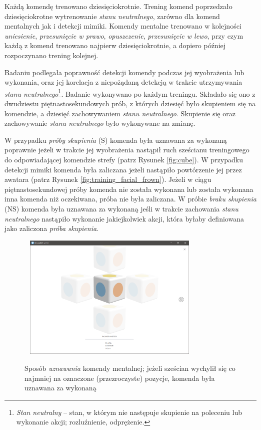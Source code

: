 \documentclass[skorowidz,skroty]{dyplomWEZUT}
\begin{document}
Każdą komendę trenowano dziesięciokrotnie. Trening komend poprzedzało dziesięciokrotne wytrenowanie \textit{stanu neutralnego}, zarówno dla komend mentalnych jak i detekcji mimiki. Komendy mentalne trenowano w kolejności \textit{uniesienie}, \textit{przesunięcie w prawo}, \textit{opuszczenie}, \textit{przesunięcie w lewo}, przy czym każdą z komend trenowano najpierw dziesięciokrotnie, a dopiero później rozpoczynano trening kolejnej.

Badaniu podlegała poprawność detekcji komendy podczas jej wyobrażenia lub wykonania, oraz jej korelacja z niepożądaną detekcją w trakcie utrzymywania \textit{stanu neutralnego}\footnote{\textit{Stan neutralny} -- stan, w którym nie następuje skupienie na poleceniu lub wykonanie akcji; rozluźnienie, odprężenie.}. Badanie wykonywano po każdym treningu. Składało się ono z dwudziestu piętnastosekundowych prób, z których dziesięć było skupieniem się na komendzie, a dziesięć zachowywaniem \textit{stanu neutralnego}. Skupienie się oraz zachowywanie \textit{stanu neutralnego} było wykonywane na zmianę.

W przypadku \textit{próby skupienia} (S) komenda była uznawana za wykonaną poprawnie jeżeli w trakcie jej wyobrażenia nastąpił ruch sześcianu treningowego do odpowiadającej komendzie strefy (patrz Rysunek \vref{fig:cube}). W przypadku detekcji mimiki komenda była zaliczana jeżeli nastąpiło powtórzenie jej przez awatara (patrz Rysunek \vref{fig:training_facial_frown}). Jeżeli w ciągu piętnastosekundowej próby komenda nie została wykonana lub została wykonana inna komenda niż oczekiwana, próba nie była zaliczana. W próbie \textit{braku skupienia} (NS) komenda była uznawana za wykonaną jeśli w trakcie zachowania \textit{stanu neutralnego} nastąpiło wykonanie jakiejkolwiek akcji, która byłaby definiowana jako zaliczona \textit{próba skupienia}.

\begin{figure}[htbp]
	\centering\includegraphics[height=6cm,width=0.8\textwidth,keepaspectratio]{graphic/emotivbci}\\
	\caption[Sposób \textit{uznawania} komendy mentalnej]{Sposób \textit{uznawania} komendy mentalnej; jeżeli sześcian wychylił się co najmniej na oznaczone (przezroczyste) pozycje, komenda była uznawana za wykonaną\label{fig:cube}}
\end{figure}
\end{document}
